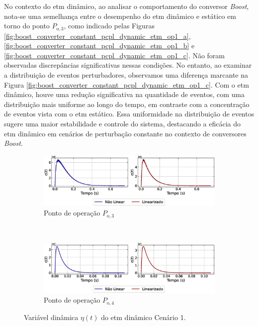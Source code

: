 No contexto do \acrshort{etm} dinâmico, ao analisar o comportamento do conversor \textit{Boost}, nota-se uma semelhança entre o desempenho do \acrshort{etm} dinâmico e estático em torno do ponto $P_{\mathrm{o}, 3}$, como indicado pelas Figuras \ref{fig:boost_converter_constant_pcpl_dynamic_etm_op1_a}, \ref{fig:boost_converter_constant_pcpl_dynamic_etm_op1_b} e \ref{fig:boost_converter_constant_pcpl_dynamic_etm_op1_c}. Não foram observadas discrepâncias significativas nessas condições. No entanto, ao examinar a distribuição de eventos perturbadores, observamos uma diferença marcante na Figura \ref{fig:boost_converter_constant_pcpl_dynamic_etm_op1_c}. Com o \acrshort{etm} dinâmico, houve uma redução significativa na quantidade de eventos, com uma distribuição mais uniforme ao longo do tempo, em contraste com a concentração de eventos vista com o \acrshort{etm} estático. Essa uniformidade na distribuição de eventos sugere uma maior estabilidade e controle do sistema, destacando a eficácia do \acrshort{etm} dinâmico em cenários de perturbação constante no contexto de conversores \textit{Boost}.

\begin{figure}[H]
  \centering
  \captionsetup{justification=centering}
  \begin{subfigure}{1.\textwidth}
    \centering
    \includegraphics[width=1.\textwidth]{figuras/dynamic-etm/boost/sim1/op1/eta.eps}
    \caption{Ponto de operação $P_{\mathrm{o}, 3}$}
  \end{subfigure}
  \\[6pt]
  \begin{subfigure}{1.\textwidth}
    \centering
    \includegraphics[width=1.\textwidth]{figuras/dynamic-etm/boost/sim1/op2/eta.eps}
    \caption{Ponto de operação $P_{\mathrm{o}, 4}$}
  \end{subfigure}
  \caption{Variável dinâmica $\eta(t)$ do \acrshort{etm} dinâmico Cenário 1.}
  \label{fig:boost_converter_constant_pcpl_dynamic_etm_eta}
\end{figure}


